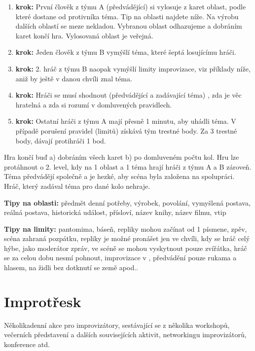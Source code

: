 \begin{enumerate}
\item  \textbf{krok:}{} První člověk z týmu A (předvádějící) si vylosuje z karet oblast, podle které dostane od protivníka téma. Tip na oblasti najdete níže. Na výrobu dalších oblastí se meze nekladou. Vybranou oblast odhazujeme a dobráním karet končí hra. Vylosovaná oblast je veřejná.
\item  \textbf{krok:}{} Jeden člověk z týmu B vymýšlí téma, které šeptá losujícímu hráči.
\item  \textbf{krok:}{} 2. hráč z týmu B naopak vymýšlí limity improvizace, viz příklady níže, aniž by ještě v danou chvíli znal téma.
\item  \textbf{krok:}{} Hráči se musí shodnout (předvádějící a zadávající téma) , zda je věc hratelná a zda si rozumí v domluvených pravidlech.
\item  \textbf{krok:}{} Ostatní hráči z týmu A mají přesně 1 minutu, aby uhádli téma. V případě porušení pravidel (limitů) získává tým trestné body. Za 3 trestné body, dávají protihráči 1 bod.
\end{enumerate}
 
Hra končí buď a) dobráním všech karet b) po domluveném počtu kol. Hru lze protáhnout o 2. level, kdy na 1 oblast a 1 téma hrají hráči z týmu A a B zároveň. Téma předvádějí společně a je hezké, aby scéna byla založena na spolupráci. Hráč, který zadával téma pro dané kolo nehraje. 
 
\textbf{Tipy na oblasti:}{} 
předmět denní potřeby, výrobek, povolání, vymyšlená postava, reálná postava, historická událost, přísloví, název knihy, název filmu, vtip 
 
\textbf{Tipy na limity:}{} pantomima, báseň, repliky mohou začínat od 1 písmene, zpěv, scéna zahraná pozpátku, repliky je možné pronášet jen ve chvíli, kdy se hráč celý hýbe, jako moderátor zpráv, ve scéně se mohou vyskytnout pouze zvířátka, hráč se za celou dobu nesmí pohnout, improvizace v , předvádění pouze rukama a hlasem, na židli bez dotknutí se země apod.. 
 
 
\needspace{5cm} \section{Improtřesk} \label{improtřesk} Několikadenní akce pro improvizátory, sestávající se z několika workshopů, večerních představení a dalších souvisejících aktivit, networkingu improvizátorů, konference atd. 
 
